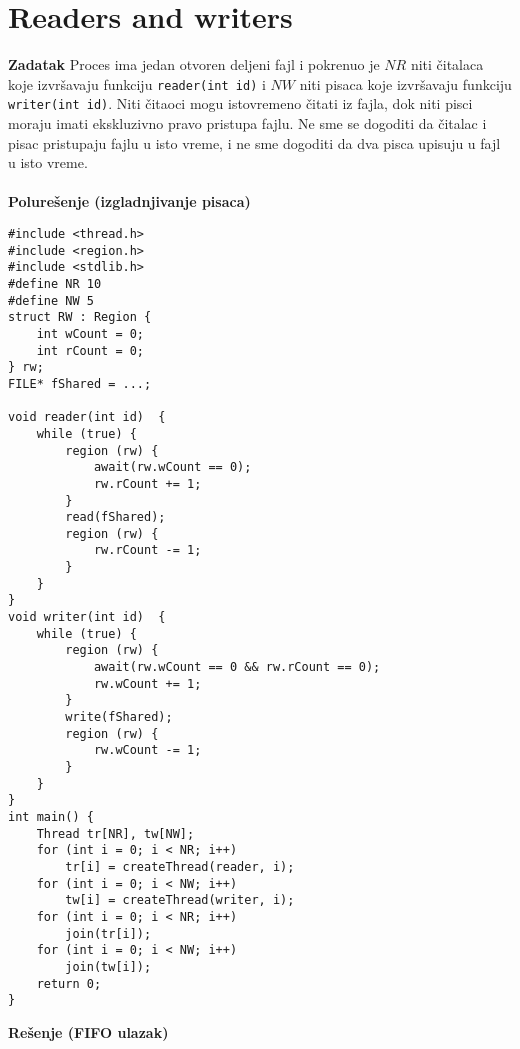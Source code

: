 \clearpage
\section{Readers and writers}
\textbf{\large Zadatak} Proces ima jedan otvoren deljeni fajl i pokrenuo je $NR$ niti \v{c}italaca koje izvr\v{s}avaju funkciju \texttt{reader(int id)} i $NW$ niti pisaca koje izvr\v{s}avaju funkciju \texttt{writer(int id)}. Niti \v{c}itaoci mogu istovremeno \v{c}itati iz fajla, dok niti pisci moraju imati ekskluzivno pravo pristupa fajlu. Ne sme se dogoditi da \v{c}italac i pisac pristupaju fajlu u isto vreme, i ne sme dogoditi da dva pisca upisuju u fajl u isto vreme.
\\\\
\textbf{\large Polure\v{s}enje (izgladnjivanje pisaca)}
\begin{lstlisting}
#include <thread.h>
#include <region.h>
#include <stdlib.h>
#define NR 10
#define NW 5
struct RW : Region {
    int wCount = 0;
    int rCount = 0;
} rw;
FILE* fShared = ...;

void reader(int id)  {
    while (true) {
        region (rw) {
            await(rw.wCount == 0);
            rw.rCount += 1;
        }
        read(fShared);
		region (rw) {
            rw.rCount -= 1;
        }
    }
}
void writer(int id)  {
    while (true) {
        region (rw) {
            await(rw.wCount == 0 && rw.rCount == 0);
            rw.wCount += 1;
        }
        write(fShared);
		region (rw) {
            rw.wCount -= 1;
        }
    }
}
int main() {
    Thread tr[NR], tw[NW];
    for (int i = 0; i < NR; i++) 
        tr[i] = createThread(reader, i);
    for (int i = 0; i < NW; i++) 
        tw[i] = createThread(writer, i);
    for (int i = 0; i < NR; i++) 
        join(tr[i]);
    for (int i = 0; i < NW; i++) 
        join(tw[i]);
    return 0;
}

\end{lstlisting}
\clearpage
\textbf{\large Re\v{s}enje (FIFO ulazak)}\\
